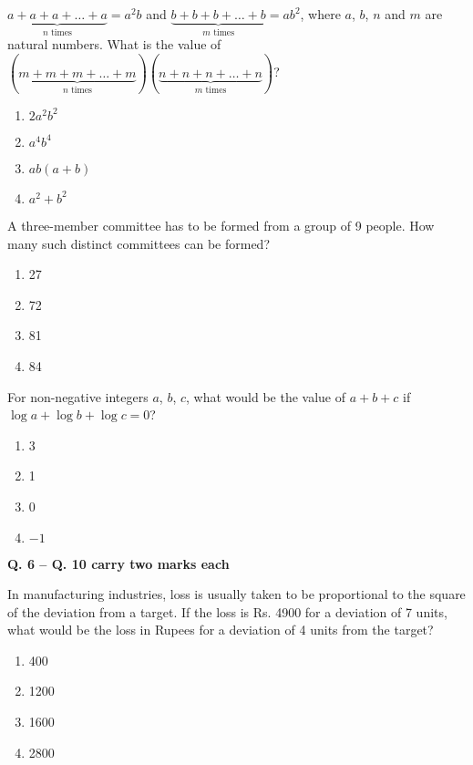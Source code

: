     \item {
    	\(\underbrace{a + a + a + \dots + a}_{n \text{ times}} = a^2 b\) and \(\underbrace{b + b + b + \dots + b}_{m \text{ times}} = a b^2\), where \(a\), \(b\), \(n\) and \(m\) are natural numbers. What is the value of \((\underbrace{m + m + m + \dots + m}_{n \text{ times}}) (\underbrace{n + n + n + \dots + n}_{m \text{ times}})\)?
    	\begin{multicols}{4}
	    	\begin{enumerate}
	    		\item \(2a^2b^2\)
	    		\item \(a^4b^4\) 
	    		\item\(ab(a+b)\) 
	    		\item \(a^2 + b^2\) 
	    	\end{enumerate}
    	\end{multicols}
    
    }    
    \item {A three-member committee has to be formed from a group of 9 people. How many such distinct committees can be formed?
    	\begin{multicols}{4}
	    	\begin{enumerate}
	    		\item 27
	    		\item 72
	    		\item 81
	    		\item 84
	    	\end{enumerate}
    	\end{multicols}}
    \item {For non-negative integers \(a\), \(b\), \(c\), what would be the value of \(a + b + c\) if \(\log a + \log b + \log c = 0\)?
    	\begin{multicols}{4}
    		\begin{enumerate}
    			\item 3
    			\item 1
    			\item 0
    			\item $-1$
    		\end{enumerate}
    	\end{multicols}
	}
	\item[]{\textbf{Q. 6 – Q. 10 carry two marks each}}
    \item {
    	In manufacturing industries, loss is usually taken to be proportional to the square of the deviation from a target. If the loss is Rs. 4900 for a deviation of 7 units, what would be the loss in Rupees for a deviation of 4 units from the target?
    	
    	
    	\begin{multicols}{4}
    		\begin{enumerate}
    			\item 400 
    			\item 1200 
    			\item 1600
    			\item 2800
    		\end{enumerate}
    	\end{multicols}
    
	}
